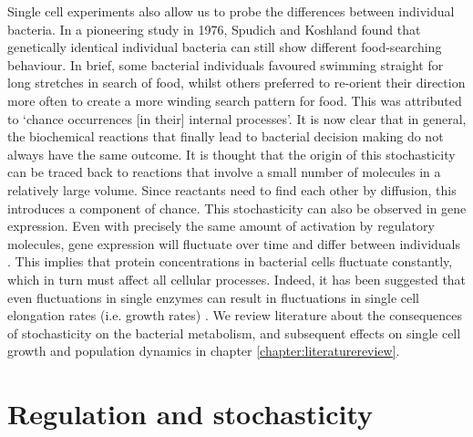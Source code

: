 Single cell experiments also allow us to probe the differences between individual bacteria.
%
In a pioneering study in 1976, 
%
Spudich and Koshland \cite{Spudich1976} found that genetically identical individual bacteria can still show different food-searching behaviour. 
In brief, some bacterial individuals favoured swimming straight for long stretches in search of food, 
whilst others preferred to re-orient their direction more often to create a more winding search pattern for food. 
%
This was attributed to \lq{chance occurrences [in their] internal processes}\rq.
%
It is now clear that in general,
the biochemical reactions that finally lead to bacterial decision making do not always have the same outcome.
%
It is thought that the origin of this stochasticity can be traced back to reactions that involve a small number of molecules in a relatively large volume.
Since reactants need to find each other by diffusion, this introduces a component of chance.
%
This stochasticity can also be observed in gene expression.
Even with precisely the same amount of activation by regulatory molecules, gene expression will fluctuate over time and differ between individuals \cite{Elowitz2002}.
%
This implies that protein concentrations in bacterial cells fluctuate constantly,
which in turn must affect all cellular processes.
%
Indeed, it has been suggested that even fluctuations in single enzymes can result in fluctuations in single cell elongation rates (i.e. growth rates) \cite{Kiviet2014}.
%
We review literature about the consequences of stochasticity on the bacterial metabolism, and subsequent effects on single cell growth and population dynamics in chapter \ref{chapter:literaturereview}.

\section{Regulation and stochasticity}

